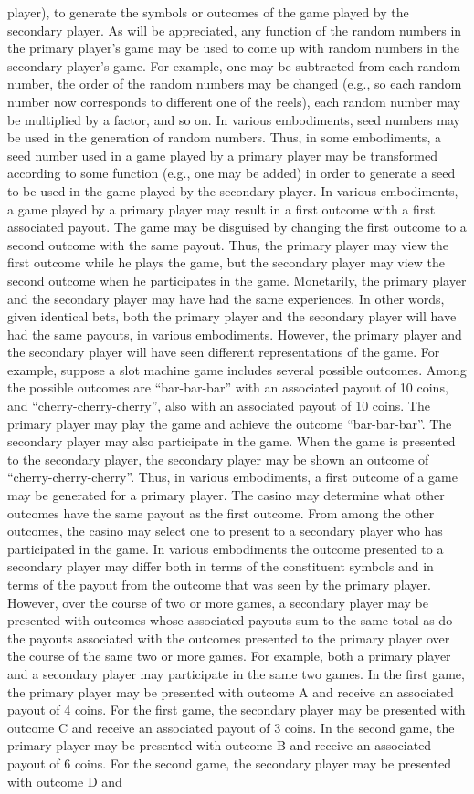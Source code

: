 \documentclass[11pt,a4paper]{article}
\begin{document}
player), to generate the symbols or outcomes of the game played by the secondary player. As will be appreciated, any function of the random numbers in the primary player's game may be used to come up with random numbers in the secondary player's game. For example, one may be subtracted from each random number, the order of the random numbers may be changed (e.g., so each random number now corresponds to different one of the reels), each random number may be multiplied by a factor, and so on. In various embodiments, seed numbers may be used in the generation of random numbers. Thus, in some embodiments, a seed number used in a game played by a primary player may be transformed according to some function (e.g., one may be added) in order to generate a seed to be used in the game played by the secondary player. In various embodiments, a game played by a primary player may result in a first outcome with a first associated payout. The game may be disguised by changing the first outcome to a second outcome with the same payout. Thus, the primary player may view the first outcome while he plays the game, but the secondary player may view the second outcome when he participates in the game. Monetarily, the primary player and the secondary player may have had the same experiences. In other words, given identical bets, both the primary player and the secondary player will have had the same payouts, in various embodiments. However, the primary player and the secondary player will have seen different representations of the game. For example, suppose a slot machine game includes several possible outcomes. Among the possible outcomes are “bar-bar-bar” with an associated payout of 10 coins, and “cherry-cherry-cherry”, also with an associated payout of 10 coins. The primary player may play the game and achieve the outcome “bar-bar-bar”. The secondary player may also participate in the game. When the game is presented to the secondary player, the secondary player may be shown an outcome of “cherry-cherry-cherry”. Thus, in various embodiments, a first outcome of a game may be generated for a primary player. The casino may determine what other outcomes have the same payout as the first outcome. From among the other outcomes, the casino may select one to present to a secondary player who has participated in the game. In various embodiments the outcome presented to a secondary player may differ both in terms of the constituent symbols and in terms of the payout from the outcome that was seen by the primary player. However, over the course of two or more games, a secondary player may be presented with outcomes whose associated payouts sum to the same total as do the payouts associated with the outcomes presented to the primary player over the course of the same two or more games. For example, both a primary player and a secondary player may participate in the same two games. In the first game, the primary player may be presented with outcome A and receive an associated payout of 4 coins. For the first game, the secondary player may be presented with outcome C and receive an associated payout of 3 coins. In the second game, the primary player may be presented with outcome B and receive an associated payout of 6 coins. For the second game, the secondary player may be presented with outcome D and 
\end{document}
